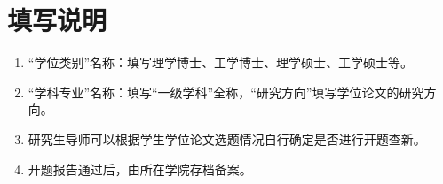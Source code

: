 \maketitle%


\section*{填写说明}
\begin{enumerate}
    \item “学位类别”名称：填写理学博士、工学博士、理学硕士、工学硕士等。
    \item “学科专业”名称：填写“一级学科”全称，“研究方向”填写学位论文的研究方向。
    \item 研究生导师可以根据学生学位论文选题情况自行确定是否进行开题查新。
    \item 开题报告通过后，由所在学院存档备案。
\end{enumerate}
\newpage

